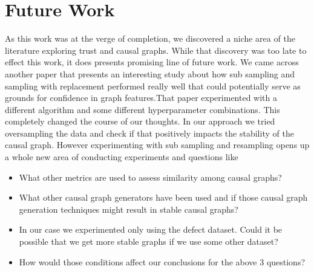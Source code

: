 \documentclass[sigconf,review,anonymous,nonacm=true]{acmart}
\begin{document}
\section{Future Work}
As this work was at the verge of completion, we discovered a niche area of the literature exploring trust and causal graphs. While that discovery was too late to effect this work, it does presents promising line of future work. We came across another paper \cite{r15} that presents an interesting study about how sub sampling and sampling with replacement performed really well that could potentially serve as grounds for confidence in graph features.That paper experimented with a different algorithm and some different hyperparameter combinations.  This completely changed the course of our thoughts. In our approach we tried oversampling the data and check if that positively impacts the stability of the causal graph. However experimenting with sub sampling and resampling opens up a whole new area of conducting experiments and questions like
\begin{itemize}
    \item What other metrics are used to assess similarity among causal graphs?
    \item What other causal graph generators have been used and if those causal graph generation techniques might result in stable causal graphs?
    \item In our case we experimented only using the defect dataset. Could it be possible that we get more stable graphs if we use some other dataset?
    \item How would those conditions affect our conclusions for the above 3 questions?
\end{itemize}
\end{document}
